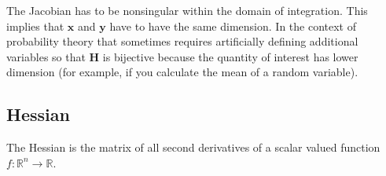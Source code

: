 The Jacobian has to be nonsingular within the domain of integration. This implies that $\mathbf{x}$ and $\mathbf{y}$ have to have the same dimension. In the context of probability theory that sometimes requires artificially defining additional variables so that $\mathbf{H}$ is bijective because the quantity of interest has lower dimension (for example, if you calculate the mean of a random variable). 

\subsection{Hessian}

The Hessian is the matrix of all second derivatives of a scalar valued function $f:\mathbb{R}^{n} \rightarrow \mathbb{R}$. 

